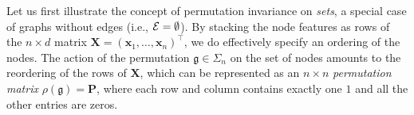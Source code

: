 


Let us first illustrate the concept of permutation invariance on \emph{sets}, a special case of graphs without edges (i.e., ${\mathcal{E}}=\emptyset$). 
%
By stacking the node features as rows of the $n\times d$ matrix
 $\mathbf{X} = (\mathbf{x}_1, \hdots, \mathbf{x}_n)^\top$, we do effectively specify an ordering of the nodes. 
The action of the permutation $\mathfrak{g}\in\Sigma_n$ on  the set of nodes amounts to the reordering of the rows of $\mathbf{X}$, which can be represented as an $n\times n$ {\em permutation matrix} $\rho(\mathfrak{g}) = \mathbf{P}$, where each row and column contains exactly one $1$ and all the other entries are zeros. 



 
 
